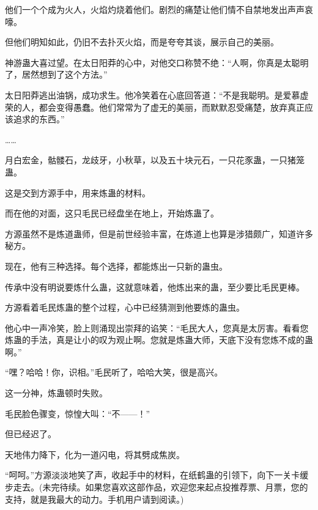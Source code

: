 \begin{this_body}
他们一个个成为火人，火焰灼烧着他们。剧烈的痛楚让他们情不自禁地发出声声哀嚎。

但他们明知如此，仍旧不去扑灭火焰，而是夸夸其谈，展示自己的美丽。

神游蛊大喜过望。在太日阳莽的心中，对他交口称赞不绝：“人啊，你真是太聪明了，居然想到了这个方法。”

太日阳莽逃出油锅，成功求生。他冷笑着在心底回答道：“不是我聪明。是爱慕虚荣的人，都会变得愚蠢。他们常常为了虚无的美丽，而默默忍受痛楚，放弃真正应该追求的东西。”

……

月白宏金，骷髅石，龙歧牙，小秋草，以及五十块元石，一只花豕蛊，一只猪笼蛊。

这是交到方源手中，用来炼蛊的材料。

而在他的对面，这只毛民已经盘坐在地上，开始炼蛊了。

方源虽然不是炼道蛊师，但是前世经验丰富，在炼道上也算是涉猎颇广，知道许多秘方。

现在，他有三种选择。每个选择，都能炼出一只新的蛊虫。

传承中没有明说要炼什么蛊，这就意味着，他炼出来的蛊，至少要比毛民更棒。

方源看着毛民炼蛊的整个过程，心中已经猜测到他要炼的蛊虫。

他心中一声冷笑，脸上则涌现出崇拜的谄笑：“毛民大人，您真是太厉害。看看您炼蛊的手法，真是让小的叹为观止啊。您就是炼蛊大师，天底下没有您炼不成的蛊啊。”

“嘿？哈哈！你，识相。”毛民听了，哈哈大笑，很是高兴。

这一分神，炼蛊顿时失败。

毛民脸色骤变，惊惶大叫：“不——！”

但已经迟了。

天地伟力降下，化为一道闪电，将其劈成焦炭。

“呵呵。”方源淡淡地笑了声，收起手中的材料，在纸鹤蛊的引领下，向下一关卡缓步走去。(未完待续。如果您喜欢这部作品，欢迎您来起点投推荐票、月票，您的支持，就是我最大的动力。手机用户请到阅读。)

\end{this_body}

